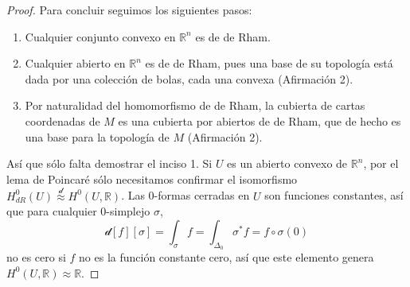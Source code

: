 \documentclass[spanish]{article}
\theoremstyle{definition}
\newcommand{\R}{\mathbb{R}}
\begin{document}
\begin{proof}
		Para concluir seguimos los siguientes pasos:
		\begin{enumerate}
			\item Cualquier conjunto convexo en $\R^n$ es de de Rham.
			\item Cualquier abierto en $\R^n$ es de de Rham, pues una base de su topología está dada por una colección de bolas, cada una convexa (Afirmación 2).
			\item Por naturalidad del homomorfismo de de Rham, la cubierta de cartas coordenadas de $M$ es una cubierta por abiertos de de Rham, que de hecho es una base para la topología de $M$ (Afirmación 2).
		\end{enumerate}
		Así que sólo falta demostrar el inciso 1. Si $U$ es un abierto convexo de $\R^n$, por el lema de Poincaré sólo necesitamos confirmar el isomorfismo $H^0_{dR}(U)\overset{\mathcal{d}}{\approx}H^0(U,\R)$. Las 0-formas cerradas en $U$ son funciones constantes, así que para cualquier 0-simplejo $\sigma$,
		\[\mathcal{d}[f][\sigma]=\int_{\sigma}f=\int_{\Delta_0}\sigma^*f=f\circ\sigma(0)\]
		no es cero si $f$ no es la función constante cero, así que este elemento genera $H^0(U,\R)\approx\R$.
		

	
		\iffalse 
		\begin{enumerate}
			\item La unión disjunta de variedades de de Rham es de de Rham.
			
			\item Cualquier convexo en $\R^n$ es de de Rham.
			
			\item Si $M$ tiene una cubierta finita de de Rham, $M$ es de de Rham.
			
			\item Si la topología de $M$ tiene una base por abiertos de de Rham, $M$ es de de Rham.
			
			\item Cualquier abierto en $\R^n$ es de de Rham.
			
			\item Cualquier variedad suave es de de Rham.
			
			
			
	\end{enumerate}\fi
		

\end{proof}
\end{document}
